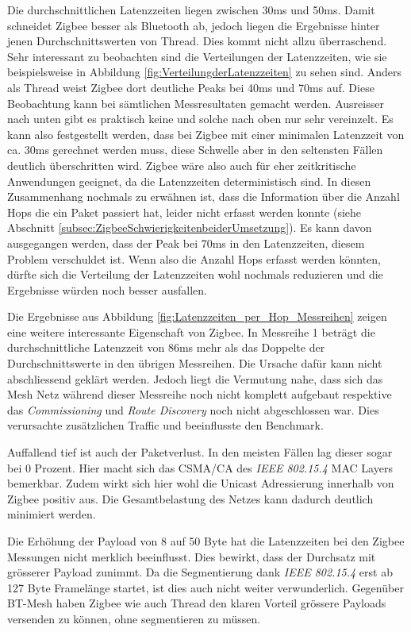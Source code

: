 Die durchschnittlichen Latenzzeiten liegen zwischen 30ms und 50ms. Damit schneidet Zigbee besser als Bluetooth ab, jedoch liegen die Ergebnisse hinter jenen Durchschnittswerten von Thread.
Dies kommt nicht allzu überraschend.
Sehr interessant zu beobachten sind die Verteilungen der Latenzzeiten, wie sie beispielsweise in Abbildung \ref{fig:VerteilungderLatenzzeiten} zu sehen sind.
Anders als Thread weist Zigbee dort deutliche Peaks bei 40ms und 70ms auf.
Diese Beobachtung kann bei sämtlichen Messresultaten gemacht werden.
Ausreisser nach unten gibt es praktisch keine und solche nach oben nur sehr vereinzelt.
Es kann also festgestellt werden, dass bei Zigbee mit einer minimalen Latenzzeit von ca. 30ms gerechnet werden muss, diese Schwelle aber in den seltensten Fällen deutlich überschritten wird.
Zigbee wäre also auch für eher zeitkritische Anwendungen geeignet, da die Latenzzeiten deterministisch sind.
In diesen Zusammenhang nochmals zu erwähnen ist, dass die Information über die Anzahl Hops die ein Paket passiert hat, leider nicht erfasst werden konnte (siehe Abschnitt \ref{subsec:ZigbeeSchwierigkeitenbeiderUmsetzung}).
Es kann davon ausgegangen werden, dass der Peak bei 70ms in den Latenzzeiten, diesem Problem verschuldet ist.
Wenn also die Anzahl Hops erfasst werden könnten, dürfte sich die Verteilung der Latenzzeiten wohl nochmals reduzieren und die Ergebnisse würden noch besser ausfallen.

Die Ergebnisse aus Abbildung \ref{fig:Latenzzeiten_per_Hop_Messreihen} zeigen eine weitere interessante Eigenschaft von Zigbee.
In Messreihe 1 beträgt die durchschnittliche Latenzzeit von 86ms mehr als das Doppelte der Durchschnittswerte in den übrigen Messreihen.
Die Ursache dafür kann nicht abschliessend geklärt werden.
Jedoch liegt die Vermutung nahe, dass sich das Mesh Netz während dieser Messreihe noch nicht komplett aufgebaut respektive das \textit{Commissioning} und \textit{Route Discovery} noch nicht abgeschlossen war.
Dies verursachte zusätzlichen Traffic und beeinflusste den Benchmark.

Auffallend tief ist auch der Paketverlust.
In den meisten Fällen lag dieser sogar bei 0 Prozent.
Hier macht sich das CSMA\slash CA des \textit{IEEE 802.15.4} MAC Layers bemerkbar.
Zudem wirkt sich hier wohl die Unicast Adressierung innerhalb von Zigbee positiv aus.
Die Gesamtbelastung des Netzes kann dadurch deutlich minimiert werden.

Die Erhöhung der Payload von 8 auf 50 Byte hat die Latenzzeiten bei den Zigbee Messungen nicht merklich beeinflusst.
Dies bewirkt, dass der Durchsatz mit grösserer Payload zunimmt.
Da die Segmentierung dank \textit{IEEE 802.15.4} erst ab 127 Byte Framelänge startet, ist dies auch nicht weiter verwunderlich.
Gegenüber BT-Mesh haben Zigbee wie auch Thread den klaren Vorteil grössere Payloads versenden zu können, ohne segmentieren zu müssen.

